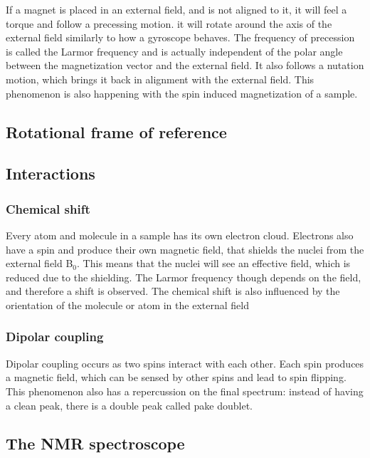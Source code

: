 \documentclass[12pt]{article}
\begin{document}
If a magnet is placed in an external field, and is not aligned to it, it will feel a torque and follow a precessing motion. it will rotate around the axis of the external field similarly to how a gyroscope behaves. The frequency of precession is called the Larmor frequency and is actually independent of the polar angle between the magnetization vector and the external field. It also follows a nutation motion, which brings it back in alignment with the external field. This phenomenon is also happening with the spin induced magnetization of a sample.

\subsection{Rotational frame of reference}

\subsection{Interactions}

\subsubsection{Chemical shift}

Every atom and molecule in a sample has its own electron cloud. Electrons also have a spin and produce their own magnetic field, that shields the nuclei from the external field B$_0$. This means that the nuclei will see an effective field, which is reduced due to the shielding. The Larmor frequency though depends on the field, and therefore a shift is observed. The chemical shift is also influenced by the orientation of the molecule or atom in the external field

\subsubsection{Dipolar coupling}

Dipolar coupling occurs as two spins interact with each other. Each spin produces a magnetic field, which can be sensed by other spins and lead to spin flipping. This phenomenon also has a repercussion on the final spectrum: instead of having a clean peak, there is a double peak called pake doublet.

\subsection{The NMR spectroscope}
\end{document}
